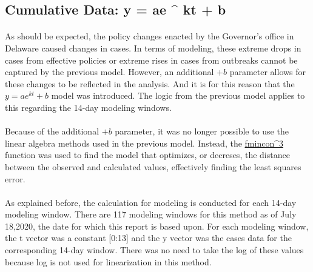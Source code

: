 \documentclass[12pt]{article}
\begin{document}
\subsection{Cumulative Data: y = ae ^ {kt} + b}
\paragraph{} As should be expected, the policy changes enacted by the Governor's office in Delaware caused changes in cases. In terms of modeling, these extreme drops in cases from effective policies or extreme rises in cases from outbreaks cannot be captured by the previous model. However, an additional $+b$ parameter allows for these changes to be reflected in the analysis. And it is for this reason that the $y = ae ^ {kt} + b$ model was introduced. The logic from the previous model applies to this regarding the 14-day modeling windows.
\paragraph{} Because of the additional $+b$ parameter, it was no longer possible to use the linear algebra methods used in the previous model. Instead, the \href{https://www.mathworks.com/help/optim/ug/fmincon.html}{fmincon^3} function was used to find the model that optimizes, or decreses, the distance between the observed and calculated values, effectively finding the least squares error.
\paragraph{} As explained before, the calculation for modeling is conducted for each 14-day modeling window. There are 117 modeling windows for this method as of July 18,2020, the date for which this report is based upon. For each modeling window, the t vector was a constant [0:13] and the y vector was the cases data for the corresponding 14-day window. There was no need to take the log of these values because log is not used for linearization in this method.
\end{document}
